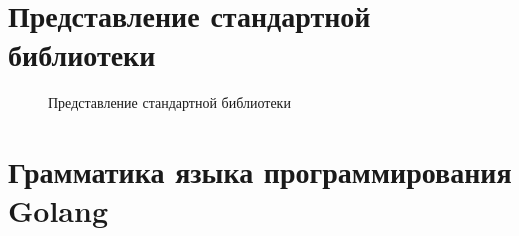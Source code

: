 
    \chapter{Представление стандартной библиотеки}
    \label{cha:appendix_builtin}


    \begin{figure}[h]
        \centering

        

        \caption{Представление стандартной библиотеки}
    \end{figure}



\chapter{Грамматика языка программирования Golang}
\label{cha:appendix1}

